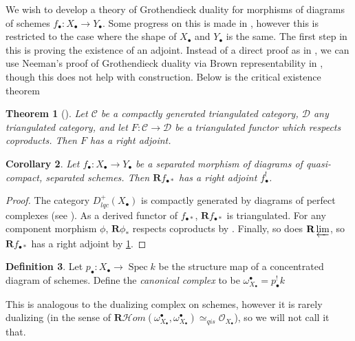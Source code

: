 \documentclass[proquest]{uwthesis}[2014/11/13]
\newtheorem{theorem}{Theorem}[section]
\newtheorem{cor}[theorem]{Corollary}
\theoremstyle{definition}
\newtheorem{definition}[theorem]{Definition}
\newcommand{\cHom}{\mathcal{H} \textit{om}}
\DeclareMathOperator{\Spec}{Spec}
\newcommand{\CL}{\mathcal{C}}
\newcommand{\DD}{\mathcal{D}}
\newcommand{\OO}{\mathcal{O}}
\newcommand{\qis}{\simeq_{qis}}
\newcommand{\bR}{\textbf{R}}
\begin{document}
We wish to develop a theory of Grothendieck duality for morphisms of diagrams of schemes $f_\bullet : X_\bullet \rightarrow Y_\bullet$.
Some progress on this is made in \cite{Lipman2009}, however this is restricted to the case where the shape of $X_\bullet$ and $Y_\bullet$ is the same.
The first step in this is proving the existence of an adjoint.
Instead of a direct proof as in \cite{Hartshorne1966}, we can use Neeman's proof of Grothendieck duality via Brown representability in \cite{Neeman1996}, though this does not help with construction.
Below is the critical existence theorem

\begin{theorem}[{\cite[4.1]{Neeman1996}}]
	\label{thm:neeman4.1}
	Let $\CL$ be a compactly generated triangulated category, $\DD$ any triangulated category, and let $F : \CL \rightarrow \DD$ be a triangulated functor which respects coproducts.
	Then $F$ has a right adjoint.
\end{theorem}

\begin{cor}
	Let $f_\bullet : X_\bullet \rightarrow Y_\bullet$ be a separated morphism of diagrams of quasi-compact, separated schemes.
	Then $\bR f_{\bullet *}$ has a right adjoint $f^!_\bullet$.
\end{cor}
\begin{proof}
	The category $D_{lqc}^+(X_\bullet)$ is compactly generated by diagrams of perfect complexes (see \cite[II 17.1]{Lipman2009}).
	As a derived functor of $f_{\bullet *}$, $\bR f_{\bullet *}$ is triangulated.
	For any component morphism $\phi$, $\bR \phi_*$ respects coproducts by \cite[1.4]{Neeman1996}.
	Finally, so does $\bR \varprojlim$, so $\bR f_{\bullet *}$ has a right adjoint by \ref{thm:neeman4.1}.
\end{proof}

\begin{definition}
	Let $p_\bullet : X_\bullet \rightarrow \Spec k$ be the structure map of a concentrated diagram of schemes.
	Define the \textit{canonical complex} to be $\omega_{X_\bullet}^\bullet = p_\bullet^! k$
\end{definition}

This is analogous to the dualizing complex on schemes, however it is rarely dualizing (in the sense of $\bR \cHom(\omega_{X_\bullet}^\bullet, \omega_{X_\bullet}^\bullet) \qis \OO_{X_\bullet}$), so we will not call it that.
\end{document}
